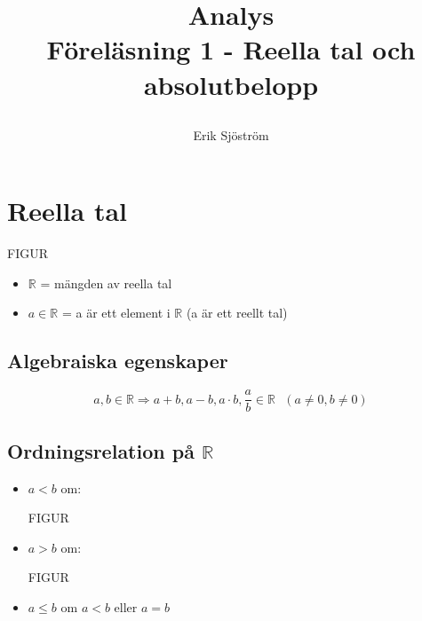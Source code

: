

\title{
     Analys\\
     Föreläsning 1 - Reella tal och absolutbelopp
    \author{Erik Sjöström}
}

\maketitle

\section{Reella tal}

\begin{center}
    FIGUR
\end{center}

\begin{itemize}
    \item $\mathbb{R}$ = mängden av reella tal\\
    \item $a \in \mathbb{R}$ = a är ett element i $\mathbb{R}$ (a är ett reellt tal)
\end{itemize}

\subsection{Algebraiska egenskaper} %
\label{sub:algebraiska_egenskaper}

\[
a,b \in \mathbb{R} \Rightarrow a + b, a - b, a \cdot b, \frac{a}{b} \in \mathbb{R} \mbox{ }(a \neq 0, b \neq 0)
\]

\subsection{Ordningsrelation på $\mathbb{R}$} %
\label{sub:ordningsrelation_p_}
\begin{itemize}
    \item $a < b$ om:
    \begin{center}
        FIGUR
    \end{center}
    \item $a > b$ om:
    \begin{center}
        FIGUR
    \end{center}
    \item $a \le b$ om $a < b$ eller $a = b$
\end{itemize}
